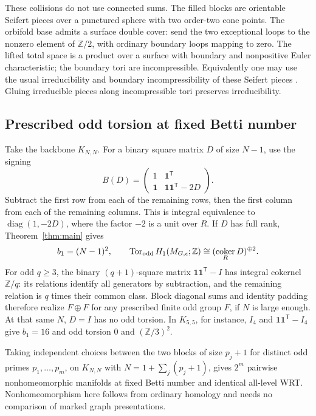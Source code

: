 \documentclass[11pt]{article}
\theoremstyle{remark}
\DeclareMathOperator{\coker}{coker}
\begin{document}
These collisions do not use connected sums. The filled blocks are orientable Seifert pieces over a punctured sphere with two order-two cone points. The orbifold base admits a surface double cover: send the two exceptional loops to the nonzero element of \(\mathbb Z/2\), with ordinary boundary loops mapping to zero. The lifted total space is a product over a surface with boundary and nonpositive Euler characteristic; the boundary tori are incompressible. Equivalently one may use the usual irreducibility and boundary incompressibility of these Seifert pieces \cite{Hempel}. Gluing irreducible pieces along incompressible tori preserves irreducibility.

\subsection{Prescribed odd torsion at fixed Betti number}
Take the backbone \(K_{N,N}\). For a binary square matrix \(D\) of size \(N-1\), use the signing
\[
      B(D)=
      \begin{pmatrix}1&\mathbf 1^{\mathsf T}\\
             \mathbf 1&\mathbf 1\mathbf 1^{\mathsf T}-2D\end{pmatrix}.
\]
Subtract the first row from each of the remaining rows, then the first column from each of the remaining columns. This is integral equivalence to \(\operatorname{diag}(1,-2D)\), where the factor \(-2\) is a unit over \(R\). If \(D\) has full rank, Theorem~\ref{thm:main} gives
\begin{equation}
 b_1=(N-1)^2,\qquad
 \operatorname{Tor}_{\rm odd}H_1(M_{G,\epsilon};\mathbb Z)
        \cong(\coker_R D)^{\oplus2}.
 \label{eq:torsion}
\end{equation}
For odd \(q\ge3\), the binary \((q+1)\)-square matrix
\(\mathbf 1\mathbf 1^{\mathsf T}-I\) has integral cokernel \(\mathbb Z/q\): its relations identify all generators by subtraction, and the remaining relation is \(q\) times their common class. Block diagonal sums and identity padding therefore realize \(F\oplus F\) for any prescribed finite odd group \(F\), if \(N\) is large enough. At that same \(N\), \(D=I\) has no odd torsion. In \(K_{5,5}\), for instance, \(I_4\) and \(\mathbf 1\mathbf 1^{\mathsf T}-I_4\) give \(b_1=16\) and odd torsion \(0\) and \((\mathbb Z/3)^2\).

Taking independent choices between the two blocks of size \(p_j+1\) for distinct odd primes \(p_1,\dots,p_m\), on \(K_{N,N}\) with \(N=1+\sum_j(p_j+1)\), gives \(2^m\) pairwise nonhomeomorphic manifolds at fixed Betti number and identical all-level WRT. Nonhomeomorphism here follows from ordinary homology and needs no comparison of marked graph presentations.
\end{document}
